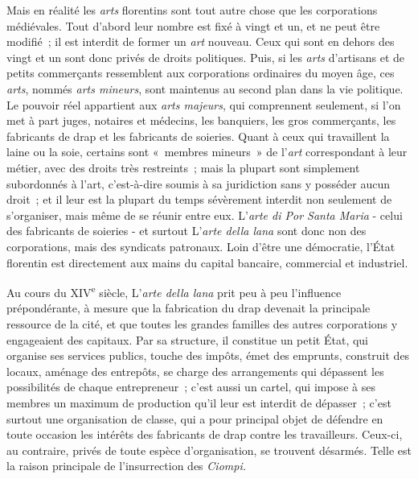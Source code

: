 \documentclass[french,twoside]{book} %
\begin{document}
Mais en réalité les {\itshape arts} florentins sont tout autre chose que les corporations médiévales. Tout d'abord leur nombre est fixé à vingt et un, et ne peut être modifié ; il est interdit de former un {\itshape art} nouveau. Ceux qui sont en dehors des vingt et un sont donc privés de droits politiques. Puis, si les {\itshape arts} d'artisans et de petits commerçants ressemblent aux corporations ordinaires du moyen âge, ces {\itshape arts}, nommés {\itshape arts mineurs}, sont maintenus au second plan dans la vie politique. Le pouvoir réel appartient aux {\itshape arts majeurs}, qui comprennent seule­ment, si l'on met à part juges, notaires et médecins, les banquiers, les gros commerçants, les fabricants de drap et les fabricants de soieries. Quant à ceux qui travaillent la laine ou la soie, certains sont « membres mineurs » de l'{\itshape art} correspondant à leur métier, avec des droits très restreints ; mais la plu­part sont simplement subordonnés à l'art, c'est-à-dire soumis à sa juridiction sans y posséder aucun droit ; et il leur est la plupart du temps sévèrement interdit non seulement de s'organiser, mais même de se réunir entre eux. L'{\itshape arte di Por Santa Maria} - celui des fabricants de soieries - et surtout L’{\itshape arte della lana} sont donc non des corporations, mais des syndicats patronaux. Loin d'être une démocratie, l'État florentin est directement aux mains du capital bancaire, commercial et industriel.\par
Au cours du XIV\textsuperscript{e} siècle, L’{\itshape arte della lana} prit peu à peu l'influence prépondérante, à mesure que la fabrication du drap devenait la principale ressource de la cité, et que toutes les grandes familles des autres corporations y engageaient des capitaux. Par sa structure, il constitue un petit État, qui organise ses services publics, touche des impôts, émet des emprunts, construit des locaux, aménage des entrepôts, se charge des arrangements qui dépassent les possibilités de chaque entrepreneur ; c'est aussi un cartel, qui impose à ses membres un maximum de production qu'il leur est interdit de dépasser ; c'est surtout une organisation de classe, qui a pour principal objet de défendre en toute occasion les intérêts des fabricants de drap contre les travailleurs. Ceux-ci, au contraire, privés de toute espèce d'organisation, se trouvent désarmés. Telle est la raison principale de l'insurrection des {\itshape Ciompi.}\par
\end{document}
